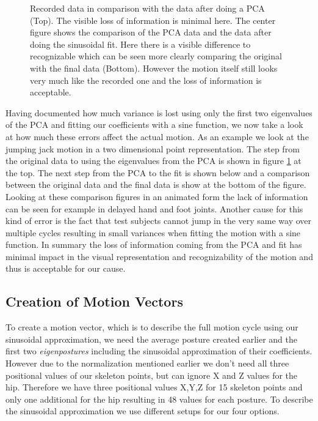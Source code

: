 \documentclass[a4paper]{article}
\begin{document}
\begin{figure}
		\caption{Recorded data in comparison with the data after doing a PCA (Top).
		The visible loss of information is minimal here.
		The center figure shows the comparison of the PCA data and the data after doing the sinusoidal fit.
		Here there is a visible difference to recognizable which can be seen more clearly comparing the original with the final data (Bottom).
		However the motion itself still looks very much like the recorded one and the loss of information is acceptable.
		}
		\label{fig:orig_pca}
\end{figure}

Having documented how much variance is lost using only the first two eigenvalues of the PCA and fitting our coefficients with a sine function, we now take a look at how much these errors affect the actual motion.
As an example we look at the jumping jack motion in a two dimensional point representation.
The step from the original data to using the eigenvalues from the PCA is shown in figure \ref{fig:orig_pca} at the top.
The next step from the PCA to the fit is shown below and a comparison between the original data and the final data is show at the bottom of the figure.
Looking at these comparison figures in an animated form the lack of information can be seen for example in delayed hand and foot joints.
Another cause for this kind of error is the fact that test subjects cannot jump in the very same way over multiple cycles resulting in small variances when fitting the motion with a sine function.
In summary the loss of information coming from the PCA and fit has minimal impact in the visual representation and recognizability of the motion and thus is acceptable for our cause.


\subsection{Creation of Motion Vectors}
To create a motion vector, which is to describe the full motion cycle using our sinusoidal approximation, we need the average posture created earlier and the first two \emph{eigenpostures} including the sinusoidal approximation of their coefficients.
However due to the normalization mentioned earlier we don't need all three positional values of our skeleton points, but can ignore X and Z values for the hip.
Therefore we have three positional values X,Y,Z for 15 skeleton points and only one additional for the hip resulting in 48 values for each posture.
To describe the sinusoidal approximation we use different setups for our four options.
\end{document}
